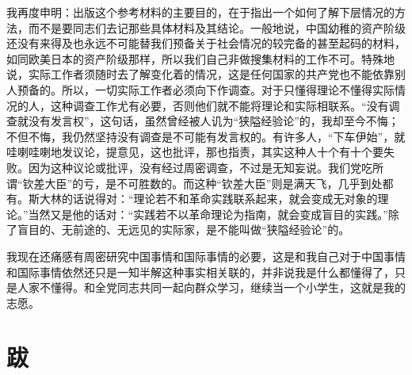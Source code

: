 我再度申明：出版这个参考材料的主要目的，在于指出一个如何了解下层情况的方法，而不是要同志们去记那些具体材料及其结论。一般地说，中国幼稚的资产阶级还没有来得及也永远不可能替我们预备关于社会情况的较完备的甚至起码的材料，如同欧美日本的资产阶级那样，所以我们自己非做搜集材料的工作不可。特殊地说，实际工作者须随时去了解变化着的情况，这是任何国家的共产党也不能依靠别人预备的。所以，一切实际工作者必须向下作调查。对于只懂得理论不懂得实际情况的人，这种调查工作尤有必要，否则他们就不能将理论和实际相联系。“没有调查就没有发言权”，这句话，虽然曾经被人讥为“狭隘经验论”的，我却至今不悔；不但不悔，我仍然坚持没有调查是不可能有发言权的。有许多人，“下车伊始”，就哇喇哇喇地发议论，提意见，这也批评，那也指责，其实这种人十个有十个要失败。因为这种议论或批评，没有经过周密调查，不过是无知妄说。我们党吃所谓“钦差大臣”的亏，是不可胜数的。而这种“钦差大臣”则是满天飞，几乎到处都有。斯大林的话说得对：“理论若不和革命实践联系起来，就会变成无对象的理论。”当然又是他的话对：“实践若不以革命理论为指南，就会变成盲目的实践。”除了盲目的、无前途的、无远见的实际家，是不能叫做“狭隘经验论”的。

我现在还痛感有周密研究中国事情和国际事情的必要，这是和我自己对于中国事情和国际事情依然还只是一知半解这种事实相关联的，并非说我是什么都懂得了，只是人家不懂得。和全党同志共同一起向群众学习，继续当一个小学生，这就是我的志愿。

\date{一九四一年四月十九日}
\section{跋}

